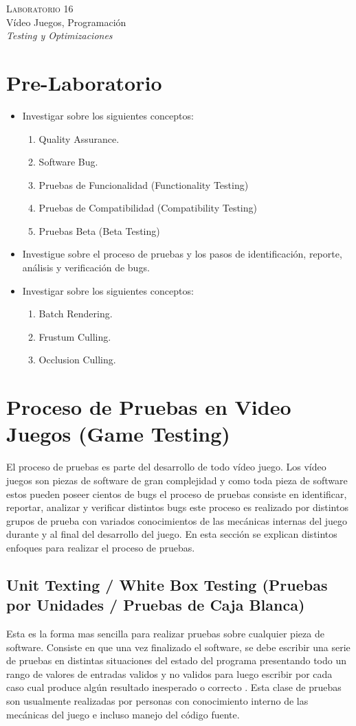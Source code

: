 \begin{center}
\textsc{\Large Laboratorio 16}~\\
{\large Vídeo Juegos, Programación}~\\
\emph{Testing y Optimizaciones}
\end{center}

\section{Pre-Laboratorio}

\begin{itemize}
\item Investigar sobre los siguientes conceptos:
\begin{enumerate}
\item Quality Assurance.
\item Software Bug.
\item Pruebas de Funcionalidad (Functionality Testing)
\item Pruebas de Compatibilidad (Compatibility Testing)
\item Pruebas Beta (Beta Testing)
\end{enumerate}
\item Investigue sobre el proceso de pruebas y los pasos de identificación, reporte, análisis y verificación de bugs.
\item Investigar sobre los siguientes conceptos:
\begin{enumerate}
\item Batch Rendering.
\item Frustum Culling.
\item Occlusion Culling.
\end{enumerate}
\end{itemize}
\section{Proceso de Pruebas en Video Juegos (Game Testing)}
El proceso de pruebas es parte del desarrollo de todo vídeo juego. Los vídeo juegos son piezas de software de gran complejidad y como toda pieza de software estos pueden poseer cientos de bugs el proceso de pruebas consiste en identificar, reportar, analizar y verificar distintos bugs este proceso es realizado por distintos grupos de prueba con variados conocimientos de las mecánicas internas del juego durante y al final del desarrollo del juego. En esta sección se explican distintos enfoques para realizar el proceso de pruebas.
\subsection{Unit Texting / White Box Testing (Pruebas por Unidades / Pruebas de Caja Blanca)}
Esta es la forma mas sencilla para realizar pruebas sobre cualquier pieza de software. Consiste en que una vez finalizado el software, se debe escribir una serie de pruebas en distintas situaciones del estado del programa presentando todo un rango de valores de entradas validos y no validos para luego escribir por cada caso cual produce algún resultado inesperado o correcto \cite[p.~155]{erikgamedevelopment}. Esta clase de pruebas son usualmente realizadas por personas con conocimiento interno de las mecánicas del juego e incluso manejo del código fuente.
